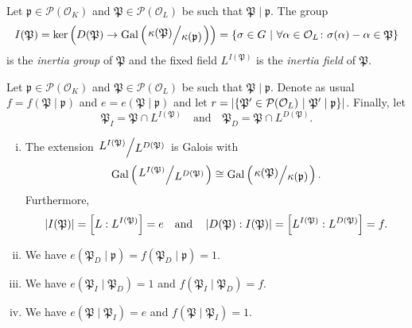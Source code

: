\begin{definicija}
Let $\mathfrak{p} \in \mathcal{P}(\mathcal{O}_K)$ and
$\mathfrak{P} \in \mathcal{P}(\mathcal{O}_L)$ be such that
$\mathfrak{P} \mid \mathfrak{p}$. The group
\[
I(\mathfrak{P}) =
\ker \br{D(\mathfrak{P}) \to
\Gal \br{\kvoc{\kappa(\mathfrak{P})}{\kappa(\mathfrak{p})}}} =
\setb{\sigma \in G}
{\forall \alpha \in \mathcal{O}_L \colon
\sigma(\alpha) - \alpha \in \mathfrak{P}}
\]
is the \emph{inertia group} of
$\mathfrak{P}$ and the fixed field $L^{I(\mathfrak{P})}$ is the
\emph{inertia field} of $\mathfrak{P}$.
\end{definicija}

\begin{izrek}
\label{hilb:thm:fer}
Let $\mathfrak{p} \in \mathcal{P}(\mathcal{O}_K)$ and
$\mathfrak{P} \in \mathcal{P}(\mathcal{O}_L)$ be such that
$\mathfrak{P} \mid \mathfrak{p}$. Denote as usual
$f = f(\mathfrak{P} \mid \mathfrak{p})$ and
$e = e(\mathfrak{P} \mid \mathfrak{p})$ and let
$r =
\left\lvert \left\{\mathfrak{P}' \in \mathcal{P}(\mathcal{O}_L)~\middle\vert~\mathfrak{P}' \mid \mathfrak{p}\right\}\right\rvert$.
Finally, let
\[
\mathfrak{P}_I = \mathfrak{P} \cap L^{I(\mathfrak{P})}
\quad \text{and} \quad
\mathfrak{P}_D = \mathfrak{P} \cap L^{D(\mathfrak{P})}.
\]

\begin{enumerate}[i)]
\item The extension
$\kvoc{L^{I(\mathfrak{P})}}{L^{D(\mathfrak{P})}}$ is Galois with
\[
\Gal \br{\kvoc{L^{I(\mathfrak{P})}}{L^{D(\mathfrak{P})}}} \cong
\Gal \br{\kvoc{\kappa(\mathfrak{P})}{\kappa(\mathfrak{p})}}.
\]
Furthermore,
\[
\left\lvert I(\mathfrak{P})\right\rvert =
\left[L : L^{I(\mathfrak{P})}\right] =
e
\quad \text{and} \quad
\left\lvert D(\mathfrak{P}) : I(\mathfrak{P})\right\rvert =
\left[L^{I(\mathfrak{P})} : L^{D(\mathfrak{P})}\right] =
f.
\]
\item We have
$e(\mathfrak{P}_D \mid \mathfrak{p}) =
f(\mathfrak{P}_D \mid \mathfrak{p}) = 1$.
\item We have $e(\mathfrak{P}_I \mid \mathfrak{P}_D) = 1$ and
$f(\mathfrak{P}_I \mid \mathfrak{P}_D) = f$.
\item We have $e(\mathfrak{P} \mid \mathfrak{P}_I) = e$ and
$f(\mathfrak{P} \mid \mathfrak{P}_I) = 1$.
\end{enumerate}
\end{izrek}

